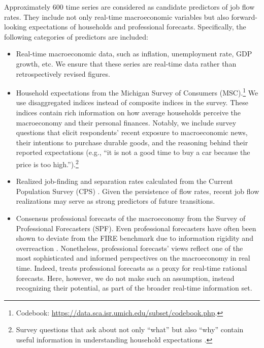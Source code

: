 Approximately 600 time series are considered as candidate predictors of job flow rates. They include not only real-time macroeconomic variables but also forward-looking expectations of households and professional forecasts. Specifically, the following categories of predictors are included:
\begin{itemize}
    \item Real-time macroeconomic data, such as inflation, unemployment rate, GDP growth, etc. We ensure that these series are real-time data rather than retrospectively revised figures.
    \item Household expectations from the Michigan Survey of Consumers (MSC).\footnote{Codebook: \url{https://data.sca.isr.umich.edu/subset/codebook.php}.} We use disaggregated indices instead of composite indices in the survey. These indices contain rich information on how average households perceive the macroeconomy and their personal finances. Notably, we include survey questions that elicit respondents' recent exposure to macroeconomic news, their intentions to purchase durable goods, and the reasoning behind their reported expectations (e.g., ``it is not a good time to buy a car because the price is too high.'').\footnote{Survey questions that ask about not only ``what'' but also ``why'' contain useful information in understanding household expectations \citep{colarieti2024and,haaland2024measuring}.} 
    \item Realized job-finding and separation rates calculated from the Current Population Survey (CPS) \citep{fujita2009cyclicality}. Given the persistence of flow rates, recent job flow realizations may serve as strong predictors of future transitions.  %
    \item Consensus professional forecasts of the macroeconomy from the Survey of Professional Forecasters (SPF). Even professional forecasters have often been shown to deviate from the FIRE benchmark due to information rigidity and overreaction \citep{coibion2015information,bordalo2020overreaction,bianchi2022belief}. Nonetheless, professional forecasts' views reflect one of the most sophisticated and informed perspectives on the macroeconomy in real time. Indeed, \cite{carroll2003macroeconomic} treats professional forecasts as a proxy for real-time rational forecasts. Here, however, we do not make such an assumption, instead recognizing their potential, as part of the broader real-time information set.
 \end{itemize}

